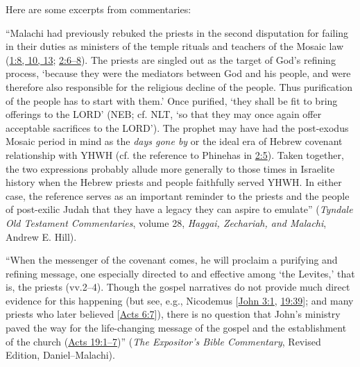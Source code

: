 		Here are some excerpts from commentaries:
		
		``Malachi had previously rebuked the priests in the second disputation for failing in their duties as ministers of the temple rituals and teachers of the Mosaic law (\hyperref[MALACHI-1-8]{1:8, 10, 13}; \hyperref[MALACHI-2-6]{2:6--8}). The priests are singled out as the target of God's refining process, `because they were the mediators between God and his people, and were therefore also responsible for the religious decline of the people. Thus purification of the people has to start with them.' Once purified, `they shall be fit to bring offerings to the LORD' (\textsc{NEB}; cf. \textsc{NLT}, `so that they may once again offer acceptable sacrifices to the LORD'). The prophet may have had the post-exodus Mosaic period in mind as the \textit{days gone by} or the ideal era of Hebrew covenant relationship with YHWH (cf. the reference to Phinehas in \hyperref[MALACHI-2-5]{2:5}). Taken together, the two expressions probably allude more generally to those times in Israelite history when the Hebrew priests and people faithfully served YHWH. In either case, the reference serves as an important reminder to the priests and the people of post-exilic Judah that they have a legacy they can aspire to emulate'' (\textit{Tyndale Old Testament Commentaries}, volume 28, \textit{Haggai, Zechariah, and Malachi}, Andrew E. Hill).
		
		``When the messenger of the covenant comes, he will proclaim a purifying and refining message, one especially directed to and effective among `the Levites,' that is, the priests (vv.2--4). Though the gospel narratives do not provide much direct evidence for this happening (but see, e.g., Nicodemus [\hyperref[JOHN-3-1]{John 3:1}, \hyperref[JOHN-19-39]{19:39}]; and many priests who later believed [\hyperref[ACTS-6-7]{Acts 6:7}]), there is no question that John's ministry paved the way for the life-changing message of the gospel and the establishment of the church (\hyperref[ACTS-19-1]{Acts 19:1--7})'' (\textit{The Expositor's Bible Commentary}, Revised Edition, Daniel--Malachi).
		
